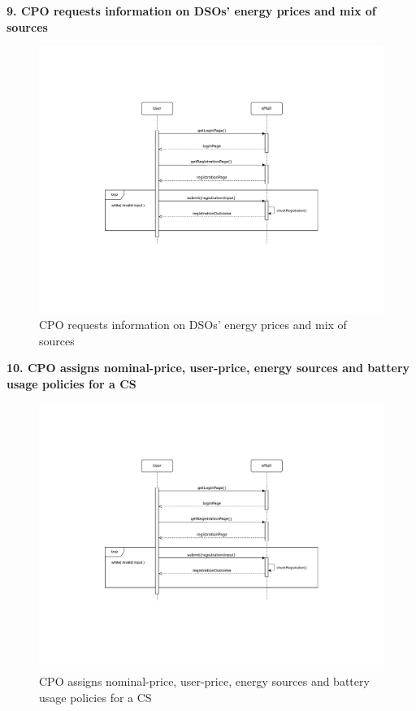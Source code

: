 \documentclass[11pt]{article}
\begin{document}
\begin{description}
    \item \textbf{9. CPO requests information on DSOs’ energy prices and mix of sources}
    \begin{figure}[!ht]
        \centering
        \includegraphics[page={9}, trim=1cm 6.8cm 1.5cm 2.5cm, width=0.9\linewidth, clip]{SequenceDiagrams.pdf}
        \caption{CPO requests information on DSOs’ energy prices and mix of sources}
    \end{figure}
    
    \item \textbf{10. CPO assigns nominal-price, user-price, energy sources and battery usage policies for a CS}
    \begin{figure}[!ht]
        \centering
        \includegraphics[page={10}, trim=1cm 1.5cm 1cm 2.5cm, width=0.9\linewidth, clip]{SequenceDiagrams.pdf}
        \caption{CPO assigns nominal-price, user-price, energy sources and battery usage policies for a CS}
    \end{figure}
    

\end{description}
\end{document}
